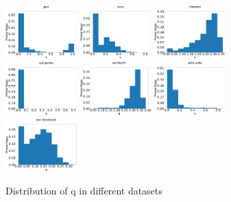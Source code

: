 \documentclass{article}
\begin{document}
\begin{figure}
    \centering
    \includegraphics[width=0.245\textwidth]{cs699/fig/ppi.pdf}
    \includegraphics[width=0.245\textwidth]{cs699/fig/cora.pdf}
    \includegraphics[width=0.245\textwidth]{cs699/fig/citeseer.pdf}\\
    \includegraphics[width=0.245\textwidth]{cs699/fig/wikipedia.pdf}
    \includegraphics[width=0.245\textwidth]{cs699/fig/ca-HepTh.pdf}
    \includegraphics[width=0.245\textwidth]{cs699/fig/wiki-vote.pdf}
    \includegraphics[width=0.245\textwidth]{cs699/fig/soc-facebook.pdf}
    \caption{Distribution of q in different datasets}
    \label{fig:dist_q}
\end{figure}
\end{document}
